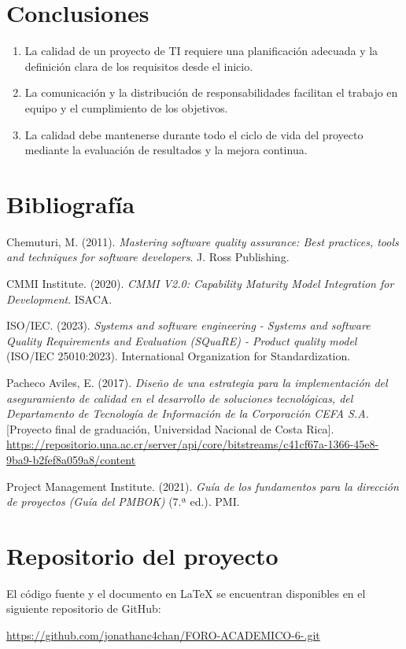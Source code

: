 \documentclass[12pt,letterpaper]{article}
\begin{document}
\section*{Conclusiones}
\begin{enumerate}
    \item La calidad de un proyecto de TI requiere una planificación adecuada y la definición clara de los requisitos desde el inicio.
    
    \item La comunicación y la distribución de responsabilidades facilitan el trabajo en equipo y el cumplimiento de los objetivos.
    
    \item La calidad debe mantenerse durante todo el ciclo de vida del proyecto mediante la evaluación de resultados y la mejora continua.
    
\end{enumerate}
\section*{ Bibliografía}
\vspace{4pt}

\hangindent=1cm \noindent Chemuturi, M. (2011). \textit{Mastering software quality assurance: Best practices, tools and techniques for software developers}. J. Ross Publishing.

\vspace{4pt}
\hangindent=1cm \noindent CMMI Institute. (2020). \textit{CMMI V2.0: Capability Maturity Model Integration for Development}. ISACA.

\vspace{4pt}
\hangindent=1cm \noindent ISO/IEC. (2023). \textit{Systems and software engineering - Systems and software Quality Requirements and Evaluation (SQuaRE) - Product quality model} (ISO/IEC 25010:2023). International Organization for Standardization.

\vspace{4pt}
   \hangindent=1cm \noindent Pacheco Aviles, E. (2017). \textit{Diseño de una estrategia para la implementación del aseguramiento de calidad en el desarrollo de soluciones tecnológicas, del Departamento de Tecnología de Información de la Corporación CEFA S.A.} [Proyecto final de graduación, Universidad Nacional de Costa Rica]. \url{https://repositorio.una.ac.cr/server/api/core/bitstreams/c41cf67a-1366-45e8-9ba9-b2fef8a059a8/content}

\vspace{4pt}
\hangindent=1cm \noindent Project Management Institute. (2021). \textit{Guía de los fundamentos para la dirección de proyectos (Guía del PMBOK)} (7.ª ed.). PMI.

   
\section*{Repositorio del proyecto}

El código fuente y el documento en \LaTeX{} se encuentran disponibles en el siguiente repositorio de GitHub:

\url{ https://github.com/jonathanc4chan/FORO-ACADEMICO-6-.git}
\end{document}
